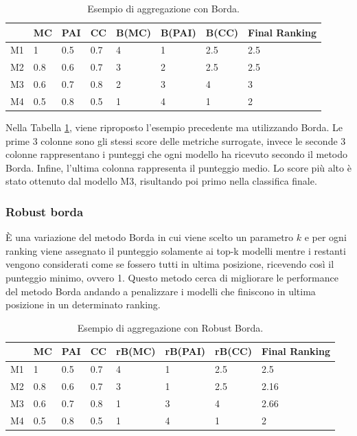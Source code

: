 \begin{table}
	
	\centering
	\begin{tabular}{|l|l|l|l|l|l|l|l|}
		\hline
		   & MC  & PAI & CC  & B(MC) & B(PAI) & B(CC) & Final Ranking \\ \hline
		M1 & 1   & 0.5 & 0.7 & 4     & 1      & 2.5   & 2.5           \\ \hline
		M2 & 0.8 & 0.6 & 0.7 & 3     & 2      & 2.5   & 2.5           \\ \hline
		M3 & 0.6 & 0.7 & 0.8 & 2     & 3      & 4     & 3             \\ \hline
		M4 & 0.5 & 0.8 & 0.5 & 1     & 4      & 1     & 2             \\ \hline
	\end{tabular}
	\caption{\label{borda}Esempio di aggregazione con Borda.}
\end{table}


Nella Tabella \ref{borda}, viene riproposto l'esempio precedente ma utilizzando Borda. Le prime 3 colonne sono gli stessi score delle metriche surrogate, invece le seconde 3 colonne rappresentano i punteggi che ogni modello ha ricevuto secondo il metodo Borda. Infine, l'ultima colonna rappresenta il punteggio medio. Lo score più alto è stato ottenuto dal modello M3, risultando poi primo nella classifica finale.
\subsubsection{Robust borda}
È una variazione del metodo Borda in cui viene scelto un parametro $k$ e per ogni ranking viene assegnato il punteggio solamente ai top-k modelli mentre i restanti vengono considerati come se fossero tutti in ultima posizione, ricevendo così il punteggio minimo, ovvero 1. Questo metodo cerca di migliorare le performance del metodo Borda andando a penalizzare i modelli che finiscono in ultima posizione in un determinato ranking. 

\begin{table}
	
	\centering
	\begin{tabular}{|l|l|l|l|l|l|l|l|}
		\hline
		   & MC  & PAI & CC  & rB(MC) & rB(PAI) & rB(CC) & Final Ranking \\ \hline
		M1 & 1   & 0.5 & 0.7 & 4      & 1       & 2.5    & 2.5           \\ \hline
		M2 & 0.8 & 0.6 & 0.7 & 3      & 1       & 2.5    & 2.16          \\ \hline
		M3 & 0.6 & 0.7 & 0.8 & 1      & 3       & 4      & 2.66          \\ \hline
		M4 & 0.5 & 0.8 & 0.5 & 1      & 4       & 1      & 2             \\ \hline
	\end{tabular}
	\caption{\label{rborda}Esempio di aggregazione con Robust Borda.}
\end{table}

